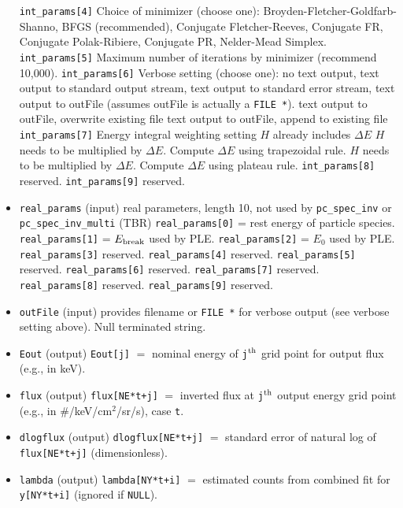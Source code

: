 \documentclass{article}    %
\begin{document}
\begin{itemize}
\subitem \verb|int_params[4]| Choice of minimizer (choose one):
\subsubitem[0] Broyden-Fletcher-Goldfarb-Shanno, BFGS (recommended),
\subsubitem[1] Conjugate Fletcher-Reeves, Conjugate FR,
\subsubitem[2] Conjugate Polak-Ribiere, Conjugate PR,
\subsubitem[3] Nelder-Mead Simplex.
\subitem \verb|int_params[5]| Maximum number of iterations by minimizer (recommend 10,000).
\subitem \verb|int_params[6]| Verbose setting (choose one):
\subsubitem[0] no text output,
\subsubitem[1] text output to standard output stream,
\subsubitem[2] text output to standard error stream,
\subsubitem[3] text output to outFile (assumes outFile is actually a \verb|FILE *|).
\subsubitem[4] text output to outFile, overwrite existing file
\subsubitem[5] text output to outFile, append to existing file
\subitem \verb|int_params[7]| Energy integral weighting setting
\subsubitem[0] $H$ already includes $\Delta E$
\subsubitem[1] $H$ needs to be multiplied by $\Delta E$. Compute $\Delta E$ using trapezoidal rule.
\subsubitem[2] $H$ needs to be multiplied by $\Delta E$. Compute $\Delta E$ using plateau rule.
\subitem \verb|int_params[8]| reserved.
\subitem \verb|int_params[9]| reserved.
\item \verb|real_params| (input) real parameters, length 10, not used by \verb|pc_spec_inv| or \verb|pc_spec_inv_multi| (TBR)
\subitem \verb|real_params[0]| = rest energy of particle species.
\subitem \verb|real_params[1]| = $E_{\rm break}$ used by PLE.
\subitem \verb|real_params[2]| = $E_0$ used by PLE.
\subitem \verb|real_params[3]| reserved.
\subitem \verb|real_params[4]| reserved.
\subitem \verb|real_params[5]| reserved.
\subitem \verb|real_params[6]| reserved.
\subitem \verb|real_params[7]| reserved.
\subitem \verb|real_params[8]| reserved.
\subitem \verb|real_params[9]| reserved.
\item \verb|outFile| (input) provides filename or \verb|FILE *| for verbose output (see verbose setting above). Null terminated string.
\item \verb|Eout| (output) \verb|Eout[j]| $=$ nominal energy of \verb|j|$^{\rm th}$ grid point for output flux (e.g., in keV).
\item \verb|flux| (output) \verb|flux[NE*t+j]| $=$ inverted flux at \verb|j|$^{\rm th}$ output energy grid point (e.g., in \#/keV/cm$^2$/sr/s), case \verb|t|.
\item \verb|dlogflux| (output) \verb|dlogflux[NE*t+j]| $=$ standard error of natural log of \verb|flux[NE*t+j]| (dimensionless).
\item \verb|lambda| (output) \verb|lambda[NY*t+i]| $=$ estimated counts from combined fit for \verb|y[NY*t+i]| (ignored if \verb|NULL|).

\end{itemize}
\end{document}
